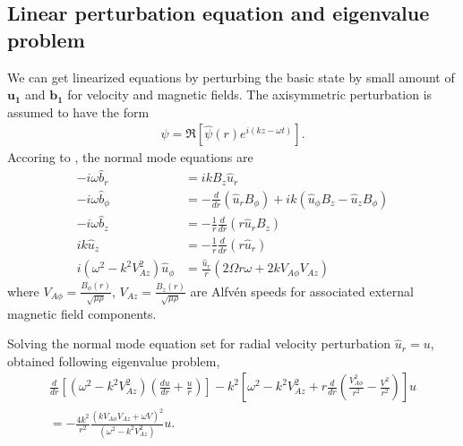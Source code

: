 \documentclass{jfm}
\newcommand{\del}{\nabla}
\begin{document}
\subsection{Linear perturbation equation and eigenvalue problem}

We can get linearized equations by perturbing the basic state by small amount of $\mathbf{u_1}$ and $\mathbf{b_1}$ for velocity and magnetic fields.
The axisymmetric perturbation is assumed to have the form
\begin{align}
    \psi=\Re\left[\hat{\psi}(r)e^{i(kz-\omega t)} \right].
    \end{align}
    Accoring to \cite{Acheson1972}, the normal mode equations are
    \begin{align}
    -i\omega\hat{b}_r&= ikB_z \hat{u}_r\\
    -i\omega\hat{b}_\phi &= -\frac{d}{dr}(\hat{u}_r B_\phi) +ik(\hat{u}_\phi B_z -\hat{u}_z B_\phi)\\
    -i\omega \hat{b}_z &= -\frac{1}{r}\frac{d}{dr} (r\hat{u}_r B_z)\\
    ik\hat{u}_z &= -\frac{1}{r}\frac{d}{dr}(r \hat{u}_r)\\
    i{(\omega^2-k^2 V_{Az}^2)}\hat{u}_\phi &= \frac{\hat{u}_r}{r}(2\Omega r \omega +2k V_{A\phi}V_{Az})
\end{align}
where $V_{A\phi}=\frac{B_\phi (r)}{\sqrt{\mu\rho}}$, $V_{Az}=\frac{B_z (r)}{\sqrt{\mu\rho}}$ are Alfv\'en speeds for associated external magnetic field components.

Solving the normal mode equation set for radial velocity perturbation $\hat{u}_r = u$, \cite{Acheson1973a} obtained following eigenvalue problem,
\begin{align}
\frac{d}{dr}\left[(\omega^2-k^2 V_{Az}^2)\left(\frac{du}{dr}+\frac{u}{r}\right)\right]-k^2\left[\omega^2-k^2 V_{Az}^2+r\frac{d}{dr}\left(\frac{V_{A\phi}^2}{r^2}-\frac{V^2}{r^2}\right)\right]u \nonumber \\
= -\frac{4 k^2}{r^2}\frac{(k V_{A\phi} V_{Az}+\omega V)^2}{(\omega^2-k^2 V_{Az}^2)} u.
\end{align}
\end{document}
